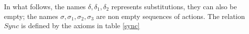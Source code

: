 
In what follows, the names $\delta, \delta_{1}, \delta_{2}$ represents substitutions, they can also be empty; the names $\sigma, \sigma_{1}, \sigma_{2}, \sigma_{3}$ are non empty sequences of actions. The relation $Sync$ is defined by the axioms in table \ref{sync}
